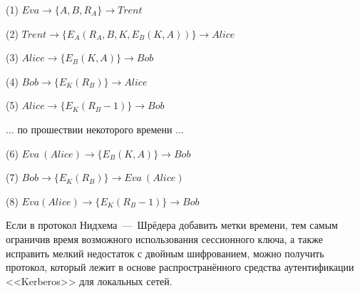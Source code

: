 \begin{protocol}
	\item[(1)] $ Eva \to \{ A, B, R_A \} \to Trent $
	\item[(2)] $ Trent \to \{ E_A \left( R_A, B, K, E_B \left( K, A \right) \right) \}	\to Alice $
	\item[(3)] $ Alice \to \{ E_B \left( K, A \right) \} \to Bob $
	\item[(4)] $ Bob \to \{ E_K \left( R_B \right) \} \to Alice $
	\item[(5)] $ Alice \to \{ E_K \left( R_B - 1 \right) \} \to Bob $
	\item[{}]  $\dots$ по прошествии некоторого времени $\dots$
	\item[(6)] $ Eva~(Alice) \to \{ E_B \left( K, A \right) \} \to Bob $
	\item[(7)] $ Bob \to \{ E_K \left( R_B \right) \} \to Eva~(Alice) $
	\item[(8)] $ Eva (Alice) \to \{ E_K \left( R_B - 1 \right) \} \to Bob $
\end{protocol}

Если в протокол Нидхема~---~Шрёдера добавить метки времени, тем самым ограничив время возможного использования сессионного ключа, а также исправить мелкий недостаток с двойным шифрованием, можно получить протокол, который лежит в основе распространённого средства аутентификации <<Kerberos>> для локальных сетей.

